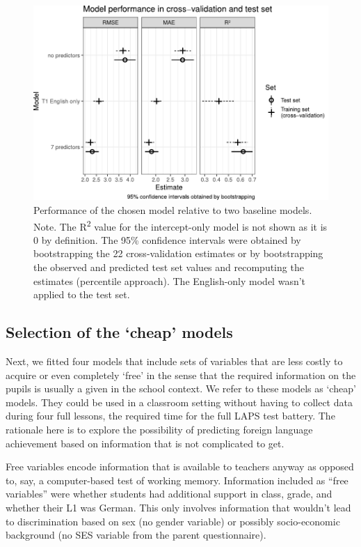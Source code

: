 \documentclass[output=paper]{langsci/langscibook}
\begin{document}
\begin{figure}
\includegraphics[width=\textwidth]{figures/Figure4.2.model_comparison-bw.pdf}
\caption{Performance of the chosen model relative to two baseline models. Note. The R\textsuperscript{2} value for the intercept-only model is not shown as it is 0 by definition. The 95\% confidence intervals were obtained by bootstrapping the 22 cross-validation estimates or by bootstrapping the observed and predicted test set values and recomputing the estimates (percentile approach). The English-only model wasn’t applied to the test set.\label{fig:04:2}}
\end{figure}

\subsection{Selection of the ‘cheap’ models}

Next, we fitted four models that include sets of variables that are less costly to acquire or even completely ‘free’ in the sense that the required information on the pupils is usually a given in the school context. We refer to these models as ‘cheap’ models. They could be used in a classroom setting without having to collect data during four full lessons, the required time for the full LAPS test battery. The rationale here is to explore the possibility of predicting foreign language achievement based on information that is not complicated to get. 

Free variables encode information that is available to teachers anyway as opposed to, say, a computer-based test of working memory. Information included as “free variables” were whether students had additional support in class, grade, and whether their L1 was German. This only involves information that wouldn’t lead to discrimination based on sex (no gender variable) or possibly socio-economic background (no SES variable from the parent questionnaire). 
\end{document}
